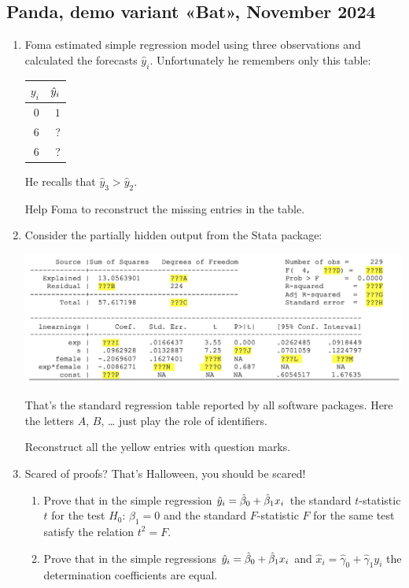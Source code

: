 \subsection{Panda, demo variant «Bat», November 2024}
\begin{enumerate}
    \item %
    Foma estimated simple regression model using three observations and calculated the forecasts $\hat{y}_i$. 
    Unfortunately he remembers only this table:

    \begin{tabular}{rr}
    \toprule
    $y_i$ & $\hat{y}_i$ \\
    \midrule
    $0$ & $1$ \\
    $6$ & ? \\
    $6$ & ? \\
    \bottomrule
    \end{tabular}
    
    He recalls that $\hat y_3 > \hat y_2$. 
    
    Help Foma to reconstruct the missing entries in the table. 
    
    \item Consider the partially hidden output from the Stata package:
    
    \begin{minipage}{\textwidth}
        \includegraphics[scale=0.6]{figures/partial_stata_table.png}
    \end{minipage}

    That's the standard regression table reported by all software packages. 
    Here the letters $A$, $B$, \dots{ } just play the role of identifiers. 
    
    Reconstruct all the yellow entries with question marks. 
    

    \item Scared of proofs? That's Halloween, you should be scared!
    \begin{enumerate}
        \item Prove that in the simple regression $\hat y_i = \hat{\beta}_0 + \hat{\beta}_1 x_i$ the 
        standard $t$-statistic $t$ for the test $H_0$: $\beta_1 = 0$ and 
        the standard $F$-statistic $F$ for the same test satisfy the relation $t^2 = F$.
        \item Prove that in the simple regressions $\hat y_i = \hat{\beta}_0 + \hat{\beta}_1 x_i$ and 
        $\hat x_i = \hat{\gamma}_0 + \hat{\gamma}_1 y_i$ the determination coefficients are equal. 
    \end{enumerate}



\end{enumerate}
